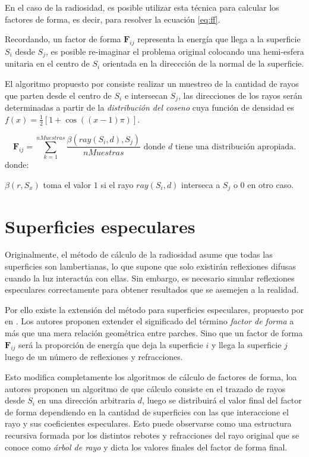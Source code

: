 En el caso de la radiosidad, es posible utilizar esta técnica para calcular los factores de forma, es decir, para resolver la ecuación \eqref{eq:ff}.

Recordando, un factor de forma $\mathbf{F}_{ij}$ representa la energía que llega a la superficie $S_{i}$ desde $S_{j}$, es posible re-imaginar el problema original colocando una hemi-esfera unitaria en el centro de $S_{i}$ orientada en la direccción de la normal de la superficie.

El algoritmo propuesto por \citeauthor{Malley}  consiste realizar un muestreo de la cantidad de  rayos que parten desde el centro de $S_{i}$ e intersecan $S_{j}$, las direcciones de los rayos serán determinadas a partir de la \textit{distribución del coseno} cuya función de densidad es $f(x) = \frac{1}{2}[1 + \cos((x-1)\pi)]$.

\begin{equation}
	\mathbf{F}_{ij} = \sum_{k=1}^{nMuestras} \frac{\beta(ray(S_{i},d), S_{j})}{nMuestras} \text{ donde } d \text{ tiene una distribución apropiada}.
	\label{eq:ffhemiesfera}
\end{equation}
donde:

$\beta(r, S_{x})$ toma el valor $1$ si el rayo $ray(S_{i},d)$ interseca a $S_{j}$ o $0$ en otro caso.

\section{Superficies especulares}

Originalmente, el método de cálculo de la radiosidad asume que todas las superficies son lambertianas, lo que supone que solo existirán reflexiones difusas cuando la luz interactúa con ellas. Sin embargo, es necesario simular reflexiones especulares correctamente para obtener resultados que se asemejen a la realidad.

Por ello existe la extensión del método para superficies especulares, propuesto por \citeauthor{Sillion} en \citeyear{Sillion}. Los autores proponen extender el significado del término \textit{factor de forma} a más que una mera relación geométrica entre parches. Sino que un factor de forma $\mathbf{F}_{ij}$ será la proporción de energía que deja la superficie $i$ y llega la superficie $j$ luego de un número de reflexiones y refracciones.

Esto modifica completamente los algoritmos de cálculo de factores de forma, loa autores proponen un algoritmo de  que cálculo consiste en el trazado de rayos desde $S_{i}$ en una dirección arbitraria $d$, luego se distribuirá el valor final del factor de forma dependiendo en la cantidad de superficies con las que interaccione el rayo y sus coeficientes especulares. Esto puede observarse como una estructura recursiva formada por los distintos rebotes y refracciones del rayo original que se conoce como \textit{árbol de rayo} y dicta los valores finales del factor de forma final.

